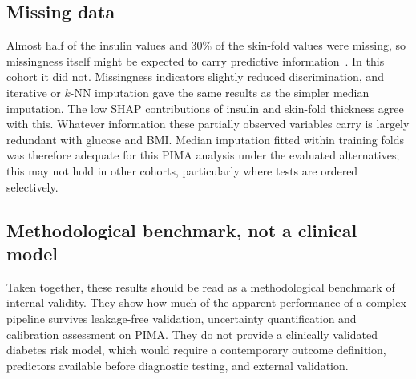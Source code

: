 \documentclass[preprint,12pt,authoryear=false]{elsarticle}
\begin{document}
\subsection{Missing data}
Almost half of the insulin values and 30\% of the skin-fold values were missing, so missingness itself might be expected to carry predictive information~\cite{sperrin2020missing}. In this cohort it did not. Missingness indicators slightly reduced discrimination, and iterative or $k$-NN imputation gave the same results as the simpler median imputation. The low SHAP contributions of insulin and skin-fold thickness agree with this. Whatever information these partially observed variables carry is largely redundant with glucose and BMI. Median imputation fitted within training folds was therefore adequate for this PIMA analysis under the evaluated alternatives; this may not hold in other cohorts, particularly where tests are ordered selectively.

\subsection{Methodological benchmark, not a clinical model}
Taken together, these results should be read as a methodological benchmark of internal validity. They show how much of the apparent performance of a complex pipeline survives leakage-free validation, uncertainty quantification and calibration assessment on PIMA. They do not provide a clinically validated diabetes risk model, which would require a contemporary outcome definition, predictors available before diagnostic testing, and external validation.
\end{document}
